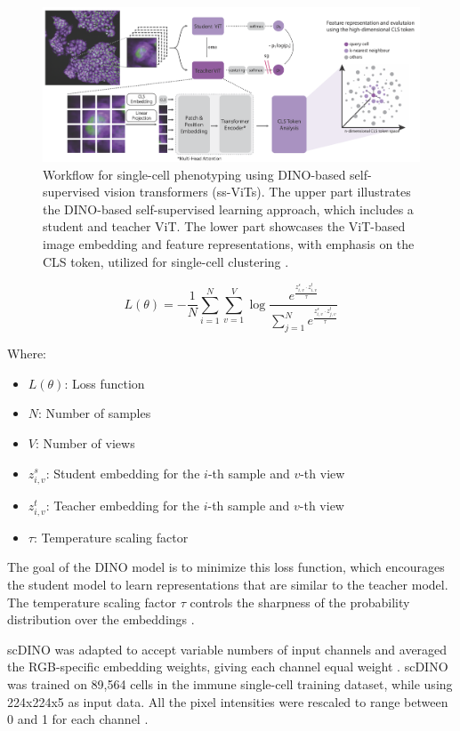 \documentclass[12pt,a4paper]{article}
\begin{document}
\begin{figure}
  \centering
  \includegraphics[width=\textwidth]{Figures/scDINO_working.png}
  \caption{Workflow for single-cell phenotyping using DINO-based self-supervised vision transformers (ss-ViTs). The upper part illustrates the DINO-based self-supervised learning approach, which includes a student and teacher ViT. The lower part showcases the ViT-based image embedding and feature representations, with emphasis on the CLS token, utilized for single-cell clustering \cite{Pfaendler2023.01.16.524226}.}
  \label{scdinoworking}
\end{figure}

$$
L(\theta) = -\frac{1}{N} \sum_{i=1}^{N} \sum_{v=1}^{V} \log \frac{e^{\frac{z_{i,v}^s \cdot z_{i,v}^t}{\tau}}}{\sum_{j=1}^{N} e^{\frac{z_{i,v}^s \cdot z_{j,v}^t}{\tau}}}
$$

Where:
\begin{itemize}
\item $L(\theta)$: Loss function
\item $N$: Number of samples
\item $V$: Number of views
\item $z_{i,v}^s$: Student embedding for the $i$-th sample and $v$-th view
\item $z_{i,v}^t$: Teacher embedding for the $i$-th sample and $v$-th view
\item $\tau$: Temperature scaling factor
\end{itemize}

The goal of the DINO model is to minimize this loss function, which encourages the student model to learn representations that are similar to the teacher model. The temperature scaling factor $\tau$ controls the sharpness of the probability distribution over the embeddings \cite{Pfaendler2023.01.16.524226}.

scDINO was adapted to accept variable numbers of input channels and averaged the RGB-specific embedding weights, giving each channel equal weight \cite{Pfaendler2023.01.16.524226}. scDINO was trained on 89,564 cells in the immune single-cell training dataset, while using 224x224x5 as input data. All the pixel intensities were rescaled to range between 0 and 1 for each channel \cite{Pfaendler2023.01.16.524226}.
\end{document}
